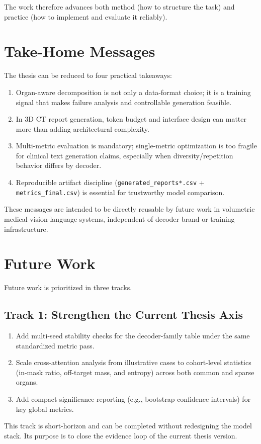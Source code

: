The work therefore advances both method (how to structure the task) and practice (how to implement and evaluate it reliably).

\section{Take-Home Messages}
The thesis can be reduced to four practical takeaways:
\begin{enumerate}
    \item Organ-aware decomposition is not only a data-format choice; it is a training signal that makes failure analysis and controllable generation feasible.
    \item In 3D CT report generation, token budget and interface design can matter more than adding architectural complexity.
    \item Multi-metric evaluation is mandatory; single-metric optimization is too fragile for clinical text generation claims, especially when diversity/repetition behavior differs by decoder.
    \item Reproducible artifact discipline (\texttt{generated\_reports*.csv} + \texttt{metrics\_final.csv}) is essential for trustworthy model comparison.
\end{enumerate}

These messages are intended to be directly reusable by future work in volumetric medical vision-language systems, independent of decoder brand or training infrastructure.

\section{Future Work}
Future work is prioritized in three tracks.

\subsection{Track 1: Strengthen the Current Thesis Axis}
\begin{enumerate}
    \item Add multi-seed stability checks for the decoder-family table under the same standardized metric pass.
    \item Scale cross-attention analysis from illustrative cases to cohort-level statistics (in-mask ratio, off-target mass, and entropy) across both common and sparse organs.
    \item Add compact significance reporting (e.g., bootstrap confidence intervals) for key global metrics.
\end{enumerate}
This track is short-horizon and can be completed without redesigning the model stack. Its purpose is to close the evidence loop of the current thesis version.

